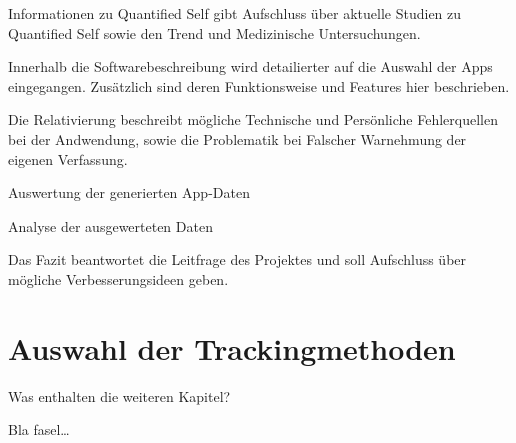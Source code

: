 Informationen zu Quantified Self gibt Aufschluss über aktuelle Studien
zu Quantified Self sowie den Trend und Medizinische Untersuchungen.

Innerhalb die Softwarebeschreibung wird detailierter auf die Auswahl der
Apps eingegangen. Zusätzlich sind deren Funktionsweise und Features hier
beschrieben.

Die Relativierung beschreibt mögliche Technische und Persönliche
Fehlerquellen bei der Andwendung, sowie die Problematik bei Falscher
Warnehmung der eigenen Verfassung.

Auswertung der generierten App-Daten

Analyse der ausgewerteten Daten

Das Fazit beantwortet die Leitfrage des Projektes und soll Aufschluss
über mögliche Verbesserungsideen geben.

\section{Auswahl der Trackingmethoden}
\label{ch:Einleitung:sec:auswahl-der-trackingmethoden}

Was enthalten die weiteren Kapitel?

Bla fasel\ldots


